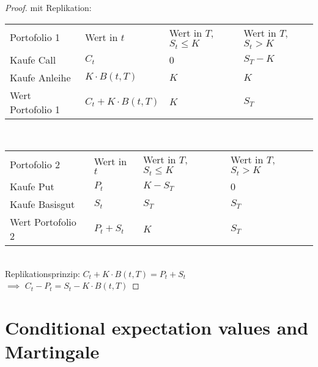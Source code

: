 \begin{proof} %
	mit Replikation:\\
	\begin{tabular}{l|l|l|l} %
		Portofolio 1 & Wert in $t$ & Wert in $T$, $S_t \le K$ & Wert in $T$, $S_t > K$\\
		Kaufe Call & $C_t$ & 0 & $S_T - K$\\
		Kaufe Anleihe & $K \cdot B(t,T)$ & $K$ & $K$\\
		Wert Portofolio 1 & $C_t + K\cdot B(t,T)$ & $K$ & $S_T$\\
	\end{tabular}\\
	\newline
	\begin{tabular}{l|l|l|l} %
		Portofolio 2 & Wert in $t$ & Wert in $T$, $S_t \le K$ & Wert in $T$, $S_t > K$\\
		Kaufe Put & $P_t$ & $K-S_T$ & 0\\
		Kaufe Basisgut & $S_t$ & $S_T$ & $S_T$\\
		Wert Portofolio 2 & $P_t + S_t$ & $K$ & $S_T$\\
	\end{tabular}\\
	Replikationsprinzip: $C_t + K\cdot B(t,T) = P_t + S_t$\\
	$\implies$ $C_t - P_t = S_t - K\cdot B(t,T)$
\end{proof} %
\section{Conditional expectation values and Martingale} %

